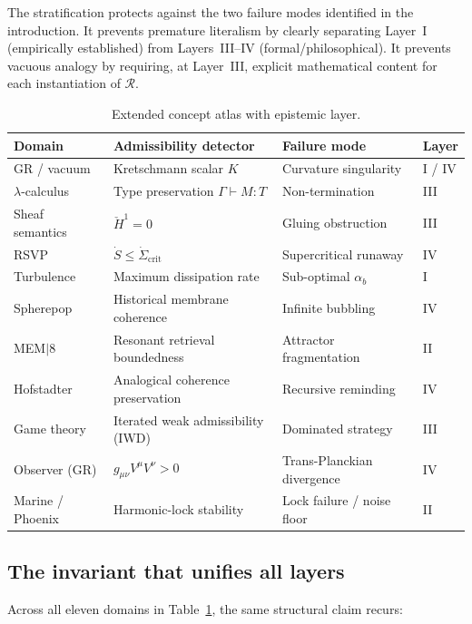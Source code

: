 \documentclass[12pt, a4paper]{article}
\theoremstyle{plain}
\theoremstyle{definition}
\theoremstyle{remark}
\newcommand{\Rcal}{\mathcal{R}}
\begin{document}
The stratification protects against the two failure modes identified
in the introduction.
It prevents premature literalism by clearly separating Layer~I
(empirically established) from Layers~III--IV (formal/philosophical).
It prevents vacuous analogy by requiring, at Layer~III, explicit
mathematical content for each instantiation of $\Rcal$.

\begin{table}[h!]
\centering
\caption{Extended concept atlas with epistemic layer.}
\label{tab:extended-atlas}
\begin{tabular}{llll}
\toprule
\textbf{Domain} & \textbf{Admissibility detector} & \textbf{Failure mode}
  & \textbf{Layer} \\
\midrule
GR / vacuum      & Kretschmann scalar $K$ & Curvature singularity
  & I / IV \\
$\lambda$-calculus & Type preservation $\Gamma\vdash M:T$ & Non-termination
  & III \\
Sheaf semantics   & $\check{H}^1 = 0$ & Gluing obstruction
  & III \\
RSVP              & $\dot{S} \leq \dot{\Sigma}_{\mathrm{crit}}$ & Supercritical runaway
  & IV \\
Turbulence        & Maximum dissipation rate & Sub-optimal $\alpha_b$
  & I \\
Spherepop         & Historical membrane coherence & Infinite bubbling
  & IV \\
MEM$|$8           & Resonant retrieval boundedness & Attractor fragmentation
  & II \\
Hofstadter        & Analogical coherence preservation & Recursive reminding
  & IV \\
Game theory       & Iterated weak admissibility (IWD) & Dominated strategy
  & III \\
Observer (GR)     & $g_{\mu\nu}V^\mu V^\nu > 0$ & Trans-Planckian divergence
  & IV \\
Marine / Phoenix  & Harmonic-lock stability & Lock failure / noise floor
  & II \\
\bottomrule
\end{tabular}
\end{table}

\subsection{The invariant that unifies all layers}

Across all eleven domains in Table~\ref{tab:extended-atlas}, the
same structural claim recurs:
\end{document}
